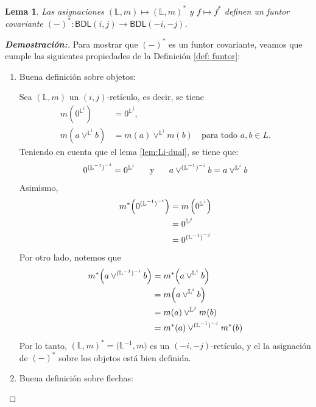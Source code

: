 \documentclass[12pt]{book}
\newtheorem{lemma}[theorem]{Lema}
\newcommand{\BDL}{\mathsf{BDL}}
\begin{document}
\begin{lemma}\label{Funtor (i,j) a (-i,-j)} Las asignaciones $(\mathbb{L},m) \mapsto (\mathbb{L},m)^{*}$ y $f \mapsto f^{*}$ definen un funtor covariante  $(-)^* \colon \BDL(i,j) \to \BDL(-i,-j)$.
\end{lemma}
\begin{proof}[\textbf{Demostración:}]
Para mostrar que $(-)^*$ es un funtor covariante, veamos que cumple las siguientes propiedades de la Definición \ref{def: funtor}:

\begin{enumerate}
    \item Buena definición sobre objetos:

Sea $(\mathbb{L},m)$ un $(i,j)$-retículo, es decir, se tiene
\begin{align*}
  m\left(0^{\mathbb{L}^i}\right) & = 0^{\mathbb{L}^j},\\[1mm]
  m\left(a\vee^{\mathbb{L}^i} b\right) & = m(a) \vee^{\mathbb{L}^j} m(b) \quad \text{para todo } a,b\in L.
\end{align*}
Teniendo en cuenta que el lema \ref{lem:Li-dual}, se tiene que:
\[ 0^{{(\mathbb{L}^{-1})}^{-i}} = 0^{\mathbb{L}^{i}} \hspace{0.5cm} \text{ y } \hspace{0.5cm} a \vee^{(\mathbb{L}^{-1})^{-i}}  b = a \vee^{\mathbb{L}^{i}} b \]
Asimismo, 
\begin{align*} m^{*}\Bigl(0^{{(\mathbb{L}^{-1})}^{-i}}\Bigr) & = m \left( 0^{\mathbb{L}^{i}} \right) \\
& = 0^{\mathbb{L}^{j}} \\
& = 0^{{(\mathbb{L}^{-1})}^{-j}}
\end{align*}
Por otro lado, notemos que
\begin{align*}
  m^{*}\Bigl(a \vee^{(\mathbb{L}^{-1})^{-i}} b \Bigr) & = m^{*}\Bigl(a \vee^{\mathbb{L}^{i}} b\Bigr) \\
& = m\Bigl(a \vee^{\mathbb{L}^{i}} b\Bigr) \\
& = m(a)\vee^{\mathbb{L}^{j}} m(b) \\
& = m^{*}(a) \vee^{(\mathbb{L}^{-1})^{-j}} m^{*}(b)
\end{align*}
Por lo tanto, $(\mathbb{L},m)^*=\bigl(\mathbb{L}^{-1}, m\bigr)$ es un $(-i,-j)$-retículo, y el la asignación de $(-)^*$ sobre los objetos está bien definida.

\medskip

\item Buena definición sobre flechas: 


\end{enumerate}
\end{proof}
\end{document}
